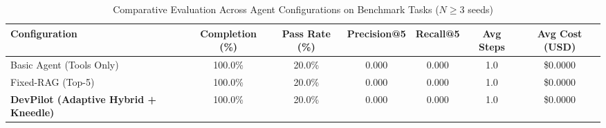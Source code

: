 \begin{table}[t]
\centering
\caption{Comparative Evaluation Across Agent Configurations on Benchmark Tasks ($N \ge 3$ seeds)}
\label{tab:devpilot_main_results}
\begin{tabular}{lcccccc}
\hline
\textbf{Configuration} & \textbf{Completion (\%)} & \textbf{Pass Rate (\%)} & \textbf{Precision@5} & \textbf{Recall@5} & \textbf{Avg Steps} & \textbf{Avg Cost (USD)} \\
\hline
Basic Agent (Tools Only) & 100.0\% & 20.0\% & 0.000 & 0.000 & 1.0 & \$0.0000 \\
Fixed-RAG (Top-5) & 100.0\% & 20.0\% & 0.000 & 0.000 & 1.0 & \$0.0000 \\
\textbf{DevPilot (Adaptive Hybrid + Kneedle)} & 100.0\% & 20.0\% & 0.000 & 0.000 & 1.0 & \$0.0000 \\
\hline
\end{tabular}
\end{table}